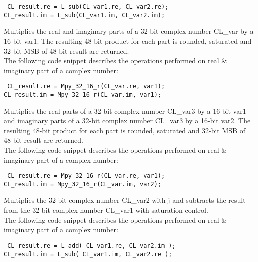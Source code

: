 {\tt {} CL\_result.re = L\_sub(CL\_var1.re, CL\_var2.re);\\
 CL\_result.im = L\_sub(CL\_var1.im, CL\_var2.im);
}


Multiplies the real and imaginary parts of a 32-bit complex number CL\_var by a 16-bit var1.
The resulting 48-bit product for each part is rounded, saturated and 32-bit MSB of 48-bit result are returned.\\
The following code snippet describes the operations performed on real \& imaginary part of a complex number:

{\tt {} CL\_result.re = Mpy\_32\_16\_r(CL\_var.re, var1);\\
 CL\_result.im = Mpy\_32\_16\_r(CL\_var.im, var1);
}


Multiplies the real parts of a 32-bit complex number CL\_var3 by a 16-bit var1 and imaginary parts of a 32-bit complex number CL\_var3 by a 16-bit var2.
The resulting 48-bit product for each part is rounded, saturated and 32-bit MSB of 48-bit result are returned.\\
The following code snippet describes the operations performed on real \& imaginary part of a complex number:

{\tt {} CL\_result.re = Mpy\_32\_16\_r(CL\_var.re, var1);\\
 CL\_result.im = Mpy\_32\_16\_r(CL\_var.im, var2);
}


Multiplies the 32-bit complex number CL\_var2 with j and subtracts the result from the 32-bit complex number CL\_var1 with saturation control.\\
The following code snippet describes the operations performed on real \& imaginary part of a complex number:

{\tt {} CL\_result.re = L\_add( CL\_var1.re, CL\_var2.im );\\
 CL\_result.im = L\_sub( CL\_var1.im, CL\_var2.re );
}


